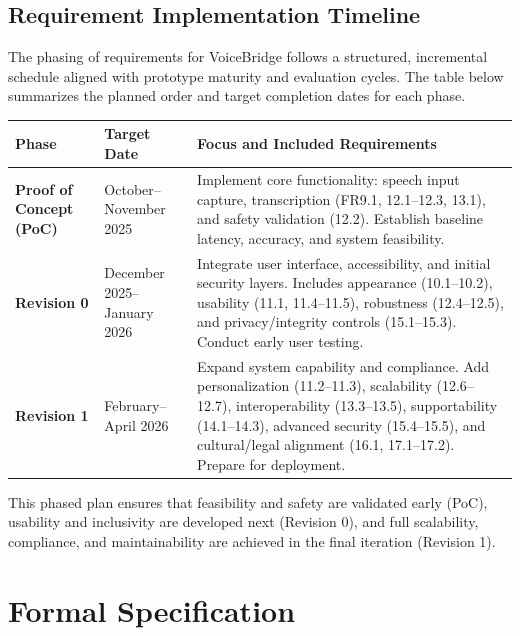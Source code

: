 \documentclass[11pt]{article}
\begin{document}
\subsection{Requirement Implementation Timeline}

The phasing of requirements for VoiceBridge follows a structured, incremental schedule aligned with prototype maturity and evaluation cycles. The table below summarizes the planned order and target completion dates for each phase.

\begin{table}[h!]
\centering
\begin{tabular}{p{3cm}p{4cm}p{7cm}}
\toprule
\textbf{Phase} & \textbf{Target Date} & \textbf{Focus and Included Requirements} \\
\midrule
\textbf{Proof of Concept (PoC)} & October--November 2025 &
Implement core functionality: speech input capture, transcription (FR9.1, 12.1–12.3, 13.1), and safety validation (12.2). Establish baseline latency, accuracy, and system feasibility. \\

\textbf{Revision 0} & December 2025--January 2026 &
Integrate user interface, accessibility, and initial security layers. Includes appearance (10.1–10.2), usability (11.1, 11.4–11.5), robustness (12.4–12.5), and privacy/integrity controls (15.1–15.3). Conduct early user testing. \\

\textbf{Revision 1} & February--April 2026 &
Expand system capability and compliance. Add personalization (11.2–11.3), scalability (12.6–12.7), interoperability (13.3–13.5), supportability (14.1–14.3), advanced security (15.4–15.5), and cultural/legal alignment (16.1, 17.1–17.2). Prepare for deployment. \\
\bottomrule
\end{tabular}
\label{tab:req-timeline}
\end{table}

\noindent This phased plan ensures that feasibility and safety are validated early (PoC), usability and inclusivity are developed next (Revision 0), and full scalability, compliance, and maintainability are achieved in the final iteration (Revision 1).




\section{Formal Specification}
\end{document}
